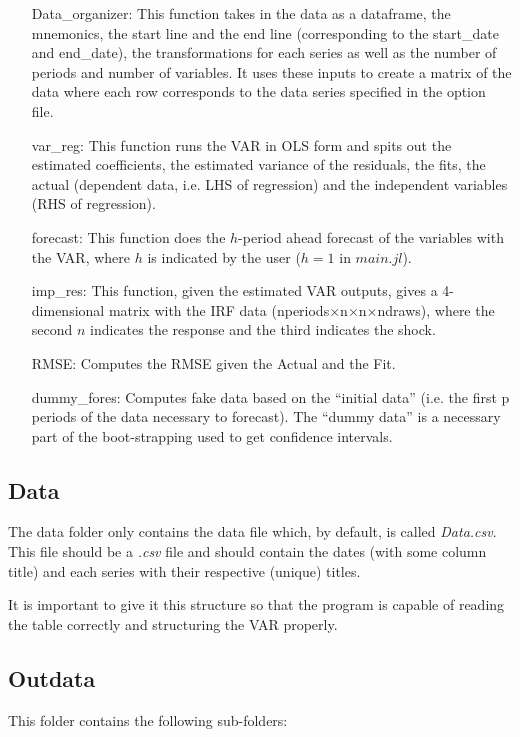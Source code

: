 \documentclass[11pt]{article}
\begin{document}
\begin{itemize}
\begin{itemize}
  \item[Data\_organizer:] This function takes in the data as a dataframe, the mnemonics, the start line and the end line (corresponding to the start\_date and end\_date), the transformations for each series as well as the number of periods and number of variables. It uses these inputs to create a matrix of the data where each row corresponds to the data series specified in the option file.
  \item[var\_reg:] This function runs the VAR in OLS form and spits out the estimated coefficients, the estimated variance of the residuals, the fits, the actual (dependent data, i.e. LHS of regression) and the independent variables (RHS of regression).
  \item[forecast:] This function does the $h$-period ahead forecast of the variables with the VAR, where $h$ is indicated by the user ($h=1$ in $main.jl$).
  \item[imp\_res:] This function, given the estimated VAR outputs, gives a 4-dimensional matrix with the IRF data (nperiods$\times$n$\times$n$\times$ndraws), where the second $n$ indicates the response and the third indicates the shock.
  \item[RMSE:] Computes the RMSE given the Actual and the Fit.
  \item[dummy\_fores:] Computes fake data based on the ``initial data'' (i.e. the first p periods of the data necessary to forecast). The ``dummy data'' is a necessary part of the boot-strapping used to get confidence intervals.
\end{itemize}

\end{itemize}


\subsection{Data}
The data folder only contains the data file which, by default, is called \textit{Data.csv}. This file should be a \textit{.csv} file and should contain the dates (with some column title) and each series with their respective (unique) titles.

It is important to give it this structure so that the program is capable of reading the table correctly and structuring the VAR properly.


\subsection{Outdata}
This folder contains the following sub-folders:
\end{document}

